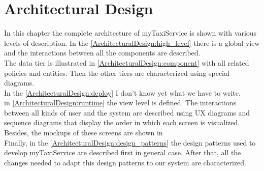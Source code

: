 \documentclass[../dd]{subfiles}
\begin{document}
\chapter{Architectural Design}
\label{architectural_design}

\setmyfancystyle

In this chapter the complete architecture of myTaxiService is shown with various levels of description. In the \autoref{ArchitecturalDesign:high_level} there is a global view and the interactions between all the components are described.\\ 
The data tier is illustrated in \autoref{ArchitecturalDesign:component} with all related policies and entities. Then the other tiers are characterized using special diagrams.\\
In the \autoref{ArchitecturalDesign:deploy} I don't know yet what we have to write.\\
in \autoref{ArchitecturalDesign:runtime} the view level is defined. The interactions between all kinds of user and the system are described using UX diagrams and sequence diagrams that display the order in which each screen is visualized. Besides, the mockups of these screens are shown in %
\\
Finally, in the \autoref{ArchitecturalDesign:design_patterns} the design patterns used to develop myTaxiService are described first in general case. After that, all the changes needed to adapt this design patterns to our system are characterized.
\end{document}
